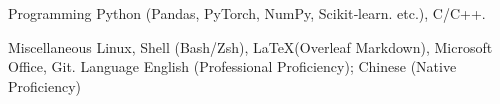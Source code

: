 

\begin{cvskills}

  \cvskill
    {Programming} %
    {Python (Pandas, PyTorch, NumPy, Scikit‑learn. etc.), C/C++.} %

  \cvskill
    {Miscellaneous} %
    {Linux, Shell (Bash/Zsh), \LaTeX (Overleaf Markdown), Microsoft Office, Git.} %
  \cvskill
    {Language} %
    {English (Professional Proficiency); Chinese (Native Proficiency)} %

\end{cvskills}
